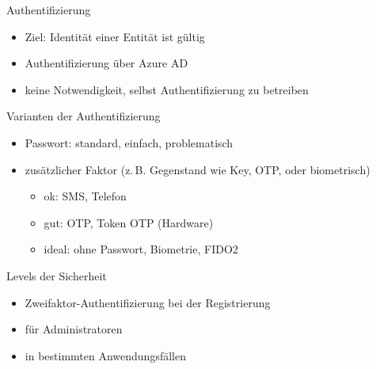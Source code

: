 
\begin{flashcard}[Definition]{Authentifizierung}
  \begin{itemize}
    \item Ziel: Identität einer Entität ist gültig
    \item Authentifizierung über Azure AD
    \item keine Notwendigkeit, selbst Authentifizierung zu betreiben
  \end{itemize}
\end{flashcard}

\begin{flashcard}[Definition]{Varianten der Authentifizierung}
  \begin{itemize}
    \item Passwort: standard, einfach, problematisch
    \item zusätzlicher Faktor (z.\,B. Gegenstand wie Key, OTP, oder biometrisch)
    \begin{itemize}
      \item ok: SMS, Telefon
      \item gut: OTP, Token OTP (Hardware)
      \item ideal: ohne Passwort, Biometrie, FIDO2
    \end{itemize}
  \end{itemize}
\end{flashcard}

\begin{flashcard}[Definition]{Levels der Sicherheit}
  \begin{itemize}
    \item Zweifaktor-Authentifizierung bei der Registrierung
    \item für Administratoren
    \item in bestimmten Anwendungsfällen
  \end{itemize}
\end{flashcard}


